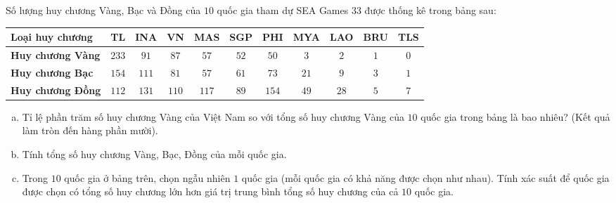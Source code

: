 \begin{bt}%
Số lượng huy chương Vàng, Bạc và Đồng của $10$ quốc gia tham dự SEA Games 33 được thống kê trong bảng sau:
\begin{center}
	\begin{tabular}{|l|c|c|c|c|c|c|c|c|c|c|}
		\hline
		\textbf{Loại huy chương} & \textbf{TL} & \textbf{INA} & \textbf{VN} & \textbf{MAS} & \textbf{SGP} & \textbf{PHI} & \textbf{MYA} & \textbf{LAO} & \textbf{BRU} & \textbf{TLS} \\ \hline
		\textbf{Huy chương Vàng} & $233$ & $91$ & $87$ & $57$ & $52$ & $50$ & $3$ & $2$ & $1$ & $0$ \\ \hline
		\textbf{Huy chương Bạc} & $154$ & $111$ & $81$ & $57$ & $61$ & $73$ & $21$ & $9$ & $3$ & $1$ \\ \hline
		\textbf{Huy chương Đồng} & $112$ & $131$ & $110$ & $117$ & $89$ & $154$ & $49$ & $28$ & $5$ & $7$ \\ \hline
	\end{tabular}
\end{center}
\begin{enumerate}[a)]
	\item Tỉ lệ phần trăm số huy chương Vàng của Việt Nam so với tổng số huy chương Vàng của $10$ quốc gia trong bảng là bao nhiêu? (Kết quả làm tròn đến hàng phần mười).
	\item Tính tổng số huy chương Vàng, Bạc, Đồng của mỗi quốc gia.
	\item Trong $10$ quốc gia ở bảng trên, chọn ngẫu nhiên $1$ quốc gia (mỗi quốc gia có khả năng được chọn như nhau). Tính xác suất để quốc gia được chọn có tổng số huy chương lớn hơn giá trị trung bình tổng số huy chương của cả $10$ quốc gia.
\end{enumerate}
\end{bt}
